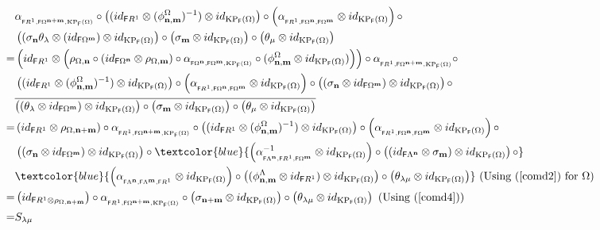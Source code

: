 \documentclass[12pt]{amsart}
\newcommand{\N}{\mathbf{n}}
\newcommand{\M}{\mathbf{m}}
\newcommand{\KP}{\operatorname{KP}}
\theoremstyle{definition}
\theoremstyle{remark}
\begin{document}
{\begin{align*}
    &\alpha_{_{\mathsf{F}R^1,\mathsf{F}\Omega^{\N+\M},\KP_\mathsf{F}(\Omega)}}\circ \left((id_{\mathsf{F}R^1}\otimes (\phi_{\N,\M}^\Omega)^{-1})\otimes id_{\KP_\mathsf{F}(\Omega)}\right)\circ \left(\alpha_{_{\mathsf{F}R^1,\mathsf{F}\Omega^\N,\mathsf{F}\Omega^\M}}\otimes id_{\KP_\mathsf{F}(\Omega)}\right)\circ\\
    &\left((\sigma_\N\theta_\lambda\otimes (id_{\mathsf{F}\Omega^\M})\otimes id_{\KP_\mathsf{F}(\Omega)}\right)\circ \left(\sigma_\M\otimes id_{\KP_\mathsf{F}(\Omega)}\right)\circ \left(\theta_\mu\otimes id_{\KP_\mathsf{F}(\Omega)}\right)\\
    =& \left(id_{\mathsf{F}R^1}\otimes \left(\rho_{\Omega,\N}\circ (id_{\mathsf{F}\Omega^\N}\otimes \rho_{\Omega,\M})\circ \alpha_{_{\mathsf{F}\Omega^\N,\mathsf{F}\Omega^\M,\KP_\mathsf{F}(\Omega)}}\circ (\phi_{\N,\M}^\Omega\otimes id_{\KP_\mathsf{F}(\Omega)})\right)\right)\circ \alpha_{_{\mathsf{F}R^1,\mathsf{F}\Omega^{\N+\M},\KP_\mathsf{F}(\Omega)}}\circ\\
    &\left((id_{\mathsf{F}R^1}\otimes (\phi_{\N,\M}^\Omega)^{-1})\otimes id_{\KP_\mathsf{F}(\Omega)}\right)\circ \left(\alpha_{_{\mathsf{F}R^1,\mathsf{F}\Omega^\N,\mathsf{F}\Omega^\M}}\otimes id_{\KP_\mathsf{F}(\Omega)}\right)\circ \left((\sigma_\N\otimes id_{\mathsf{F}\Omega^\M})\otimes id_{\KP_\mathsf{F}(\Omega)}\right)\circ\\
    &\overline{\left((\theta_\lambda\otimes id_{\mathsf{F}\Omega^\M})\otimes id_{\KP_\mathsf{F}(\Omega)}\right)\circ \left(\sigma_\M\otimes id_{\KP_\mathsf{F}(\Omega)}\right)\circ \left(\theta_\mu\otimes id_{\KP_\mathsf{F}(\Omega)}\right)}\\
    =& \left(id_{\mathsf{F}R^1}\otimes \rho_{\Omega,\N+\M}\right)\circ \alpha_{_{\mathsf{F}R^1,\mathsf{F}\Omega^{\N+\M},\KP_\mathsf{F}(\Omega)}}\circ \left((id_{\mathsf{F}R^1}\otimes (\phi_{\N,\M}^\Omega)^{-1})\otimes id_{\KP_\mathsf{F}(\Omega)}\right)\circ \left(\alpha_{_{\mathsf{F}R^1,\mathsf{F}\Omega^\N,\mathsf{F}\Omega^\M}}\otimes id_{\KP_\mathsf{F}(\Omega)}\right)\circ\\
    &\left((\sigma_\N\otimes id_{\mathsf{F}\Omega^\M})\otimes id_{\KP_\mathsf{F}(\Omega)}\right)\circ \textcolor{blue}{\left(\alpha_{_{\mathsf{F}\Lambda^\N,\mathsf{F}R^1,\mathsf{F}\Omega^\M}}^{-1}\otimes id_{\KP_\mathsf{F}(\Omega)}\right)\circ \left((id_{\mathsf{F}\Lambda^\N}\otimes \sigma_\M)\otimes id_{\KP_\mathsf{F}(\Omega)}\right)\circ}\\
    &\textcolor{blue}{\left(\alpha_{_{\mathsf{F}\Lambda^\N,\mathsf{F}\Lambda^\M,\mathsf{F}R^1}}\otimes id_{\KP_\mathsf{F}(\Omega)}\right)\circ \left((\phi_{\N,\M}^\Lambda\otimes id_{\mathsf{F}R^1})\otimes id_{\KP_\mathsf{F}(\Omega)}\right)\circ \left(\theta_{\lambda\mu}\otimes id_{\KP_\mathsf{F}(\Omega)}\right)}~\text{(Using (\ref{comd2}) for $\Omega$)}\\
    =&\left(id_{\mathsf{F}R^1\otimes \rho_{\Omega,\N+\M}}\right)\circ \alpha_{_{\mathsf{F}R^1,\mathsf{F}\Omega^{\N+\M},\KP_\mathsf{F}(\Omega)}}\circ \left(\sigma_{\N+\M}\otimes id_{\KP_\mathsf{F}(\Omega)}\right)\circ \left(\theta_{\lambda\mu}\otimes id_{\KP_\mathsf{F}(\Omega)}\right)~\text{(Using (\ref{comd4}))}\\
    =& S_{\lambda\mu}
\end{align*}
}
\end{document}
